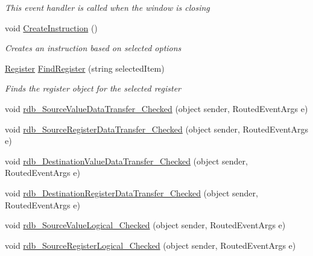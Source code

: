 \begin{DoxyCompactItemize}
\begin{DoxyCompactList}\small\item\em This event handler is called when the window is closing \end{DoxyCompactList}\item 
void \hyperlink{class_c_p_u___o_s___simulator_1_1_instructions_window_aafdc8c843b7f2d0e4c434edc569923c6}{Create\+Instruction} ()
\begin{DoxyCompactList}\small\item\em Creates an instruction based on selected options \end{DoxyCompactList}\item 
\hyperlink{class_c_p_u___o_s___simulator_1_1_c_p_u_1_1_register}{Register} \hyperlink{class_c_p_u___o_s___simulator_1_1_instructions_window_a2fbd163f2638a32f7cfbf831dc91582f}{Find\+Register} (string selected\+Item)
\begin{DoxyCompactList}\small\item\em Finds the register object for the selected register \end{DoxyCompactList}\item 
void \hyperlink{class_c_p_u___o_s___simulator_1_1_instructions_window_adce5e32de39213723ea06d279681b8ea}{rdb\+\_\+\+Source\+Value\+Data\+Transfer\+\_\+\+Checked} (object sender, Routed\+Event\+Args e)
\item 
void \hyperlink{class_c_p_u___o_s___simulator_1_1_instructions_window_aec7d6be51c8cd95dce4db01a5c66047e}{rdb\+\_\+\+Source\+Register\+Data\+Transfer\+\_\+\+Checked} (object sender, Routed\+Event\+Args e)
\item 
void \hyperlink{class_c_p_u___o_s___simulator_1_1_instructions_window_a8572bfa72449f43f800dd55961ad7837}{rdb\+\_\+\+Destination\+Value\+Data\+Transfer\+\_\+\+Checked} (object sender, Routed\+Event\+Args e)
\item 
void \hyperlink{class_c_p_u___o_s___simulator_1_1_instructions_window_a61a12a00e2f822ca948b2216b5dd85db}{rdb\+\_\+\+Destination\+Register\+Data\+Transfer\+\_\+\+Checked} (object sender, Routed\+Event\+Args e)
\item 
void \hyperlink{class_c_p_u___o_s___simulator_1_1_instructions_window_ad1c6df35e2658c60a531a1f651f47434}{rdb\+\_\+\+Source\+Value\+Logical\+\_\+\+Checked} (object sender, Routed\+Event\+Args e)
\item 
void \hyperlink{class_c_p_u___o_s___simulator_1_1_instructions_window_af6e5871e2b68c4922775ea1f65309bac}{rdb\+\_\+\+Source\+Register\+Logical\+\_\+\+Checked} (object sender, Routed\+Event\+Args e)

\end{DoxyCompactItemize}
